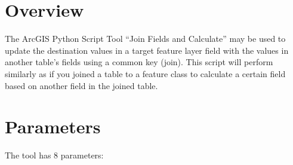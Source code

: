 \documentclass[openany]{book}
\theoremstyle{definition}
\theoremstyle{definition}
\theoremstyle{definition}
\theoremstyle{remark}
\begin{document}
\section{Overview}\label{overview-1}

The ArcGIS Python Script Tool ``Join Fields and Calculate'' may be used
to update the destination values in a target feature layer field with
the values in another table's fields using a common key (join). This
script will perform similarly as if you joined a table to a feature
class to calculate a certain field based on another field in the joined
table.

\section{Parameters}\label{parameters-1}

The tool has 8 parameters:
\end{document}
